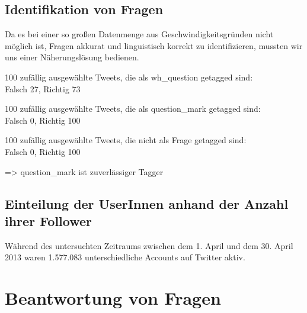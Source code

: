 \documentclass[twitterDialoge.tex]{subfiles}
\begin{document}
\subsection{Identifikation von Fragen}

Da es bei einer so großen Datenmenge aus Geschwindigkeitsgründen nicht möglich ist, Fragen akkurat und linguistisch korrekt zu identifizieren, mussten wir uns einer Näherungslösung bedienen.

100 zufällig ausgewählte Tweets, die als wh_question getagged sind:\\
Falsch 27, Richtig 73

100 zufällig ausgewählte Tweets, die als question_mark getagged sind:\\
Falsch 0, Richtig 100

100 zufällig ausgewählte Tweets, die nicht als Frage getagged sind:\\
Falsch 0, Richtig 100


=> question\_mark ist zuverlässiger Tagger

\subsection{Einteilung der UserInnen anhand der Anzahl ihrer Follower}
Während des untersuchten Zeitraums zwischen dem 1. April und dem 30. April 2013 waren 1.577.083 unterschiedliche Accounts auf Twitter aktiv.

\section{Beantwortung von Fragen}




\end{document}
